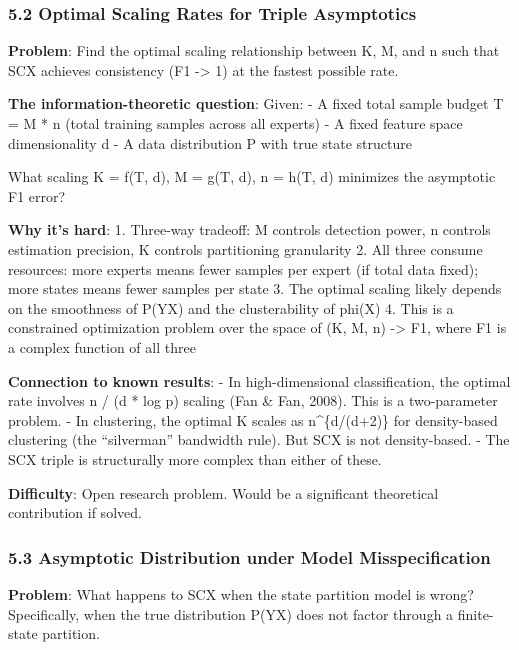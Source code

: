 \documentclass[
  12pt,
]{ctexart}
\begin{document}
\subsubsection{5.2 Optimal Scaling Rates for Triple
Asymptotics}\label{optimal-scaling-rates-for-triple-asymptotics}

\textbf{Problem}: Find the optimal scaling relationship between K, M,
and n such that SCX achieves consistency (F1 -\textgreater{} 1) at the
fastest possible rate.

\textbf{The information-theoretic question}: Given: - A fixed total
sample budget T = M * n (total training samples across all experts) - A
fixed feature space dimensionality d - A data distribution P with true
state structure

What scaling K = f(T, d), M = g(T, d), n = h(T, d) minimizes the
asymptotic F1 error?

\textbf{Why it's hard}: 1. Three-way tradeoff: M controls detection
power, n controls estimation precision, K controls partitioning
granularity 2. All three consume resources: more experts means fewer
samples per expert (if total data fixed); more states means fewer
samples per state 3. The optimal scaling likely depends on the
smoothness of P(Y\textbar X) and the clusterability of phi(X) 4. This is
a constrained optimization problem over the space of (K, M, n)
-\textgreater{} F1, where F1 is a complex function of all three

\textbf{Connection to known results}: - In high-dimensional
classification, the optimal rate involves n / (d * log p) scaling (Fan
\& Fan, 2008). This is a two-parameter problem. - In clustering, the
optimal K scales as n\^{}\{d/(d+2)\} for density-based clustering (the
``silverman'' bandwidth rule). But SCX is not density-based. - The SCX
triple is structurally more complex than either of these.

\textbf{Difficulty}: Open research problem. Would be a significant
theoretical contribution if solved.

\subsubsection{5.3 Asymptotic Distribution under Model
Misspecification}\label{asymptotic-distribution-under-model-misspecification}

\textbf{Problem}: What happens to SCX when the state partition model is
wrong? Specifically, when the true distribution P(Y\textbar X) does not
factor through a finite-state partition.
\end{document}
